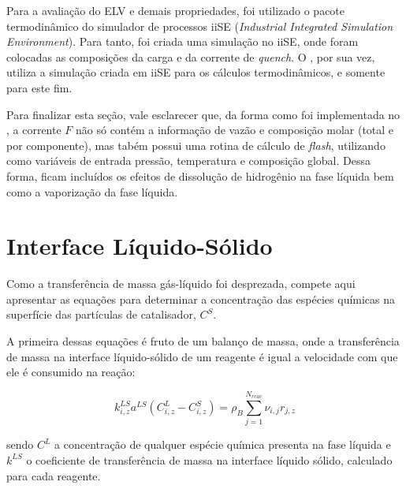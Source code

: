 Para a avaliação do ELV e demais propriedades, foi utilizado o pacote
termodinâmico do simulador de processos iiSE (\emph{Industrial Integrated
Simulation Environment}). Para tanto, foi criada uma simulação no iiSE, onde
foram colocadas as composições da carga e da corrente de \emph{quench}. O \emso,
por sua vez, utiliza a simulação criada em iiSE para os cálculos termodinâmicos,
e somente para este fim. 

Para finalizar esta seção, vale esclarecer que, da forma como foi implementada
no \emso, a corrente $F$ não só contém a informação de vazão e composição molar
(total e por componente), mas tabém possui uma rotina de cálculo de
\emph{flash}, utilizando como variáveis de entrada pressão, temperatura e
composição global. Dessa forma, ficam incluídos os efeitos de dissolução de
hidrogênio na fase líquida bem como a vaporização da fase líquida.


\section{Interface Líquido-Sólido} \label{sec:interfaceliquidosolido}

Como a transferência de massa gás-líquido foi desprezada, compete aqui
apresentar as equações para determinar a concentração das espécies químicas
na superfície das partículas de catalisador, $C^S$. 

A primeira dessas equações é fruto de um balanço de massa, onde a
transferência de massa na interface líquido-sólido de um reagente é igual a
velocidade com que ele é consumido na reação:

\begin{equation}
k_{i,z}^{LS}a^{LS}(C^L_{i,z}-C^S_{i,z}) = \rho_B
\displaystyle\sum_{j=1}^{N_{reac}}
\nu_{i,j}r_{j,z}
\label{eq:transferenciamassa}
\end{equation}

sendo $C^{L}$ a concentração de qualquer espécie química presenta na fase
líquida e $k^{LS}$ o coeficiente de transferência de massa na interface líquido
sólido, calculado para cada reagente.


